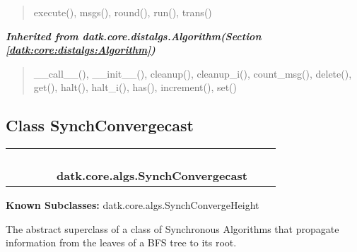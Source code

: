 \begin{quote}
execute(), msgs(), round(), run(), trans()
\end{quote}

\large{\textbf{\textit{Inherited from datk.core.distalgs.Algorithm\textit{(Section \ref{datk:core:distalgs:Algorithm})}}}}

\begin{quote}
\_\_call\_\_(), \_\_init\_\_(), cleanup(), cleanup\_i(), count\_msg(), delete(), get(), halt(), halt\_i(), has(), increment(), set()
\end{quote}


\subsection{Class SynchConvergecast}

    \label{datk:core:algs:SynchConvergecast}
\begin{tabular}{cccccccc}
\multicolumn{2}{r}{\settowidth{\BCL}{datk.core.distalgs.Algorithm}\multirow{2}{\BCL}{datk.core.distalgs.Algorithm}}
&&
&&
  \\\cline{3-3}
  &&\multicolumn{1}{c|}{}
&&
&&
  \\
\multicolumn{4}{r}{\settowidth{\BCL}{datk.core.distalgs.Synchronous\_Algorithm}\multirow{2}{\BCL}{datk.core.distalgs.Synchronous\_Algorithm}}
&&
  \\\cline{5-5}
  &&&&\multicolumn{1}{c|}{}
&&
  \\
&&&&\multicolumn{2}{l}{\textbf{datk.core.algs.SynchConvergecast}}
\end{tabular}

\textbf{Known Subclasses:} datk.core.algs.SynchConvergeHeight

The abstract superclass of a class of Synchronous Algorithms that propagate
information from the leaves of a BFS tree to its root.

